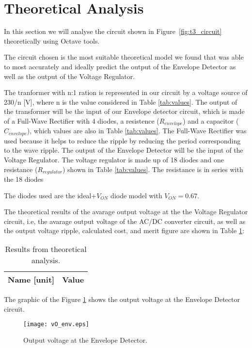 \newpage
{}
\section{Theoretical Analysis}
\label{sec:analysis}

In this section we will analyse the circuit shown in Figure~\ref{fig:t3_circuit} theoretically using Octave tools.\par
The circuit chosen is the most suitable theoretical model we found that was able to most accurately and ideally predict the output of the Envelope Detector as well as the output of the Voltage Regulator.

The tranformer with n:1 ration is represented in our circuit by a voltage source of 230/n [V], where n is the value considered in Table \ref{tab:values}. The output of the transformer will be the input of our Envelope detector circuit, which is made of a Full-Wave Rectifier with 4 diodes, a resistence ($R_{envelope}$) and a capacitor ($C_{envelope}$), which values are also in Table \ref{tab:values}. The Full-Wave Rectifier was used because it helps to reduce the ripple by reducing the period corresponding to the wave ripple. The output of the Envelope Detector will be the input of the Voltage Regulator. The voltage regulator is made up of 18 diodes and one resistance ($R_{regulator}$) shown in Table \ref{tab:values}. The resistance is in series with the 18 diodes

The diodes used are the ideal+$V_{ON}$ diode model with $V_{ON} = 0.67$.

The theoretical results of the avarage output voltage at the the Voltage Regulator circuit, i.e, the avarage output voltage of the AC/DC converter circuit, as well as the output voltage ripple, calculated cost, and merit figure are shown in Table \ref{tab:teo}:  

\begin{table}[H]
  \centering
  \begin{tabular}{|l|r|}
    \hline    
    {\bf Name [unit]} & {\bf Value} \\ \hline
    
  \end{tabular}
  \caption{Results from theoretical analysis.}
  \label{tab:teo}
\end{table}

The graphic of the Figure \ref{fig:vO_env} shows the output voltage at the Envelope Detector circuit.
 
\begin{figure}[H] \centering
  \texttt{[image: vO\_env.eps]}
  \caption{Output voltage at the Envelope Detector.}
  \label{fig:vO_env}
\end{figure} 

